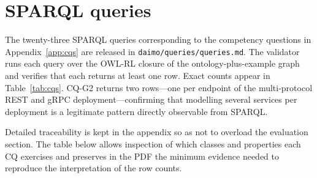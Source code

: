 \documentclass[Afour,sagev,times]{sagej}
\newcommand{\code}[1]{\texttt{#1}}
\begin{document}
\section{SPARQL queries}\label{app:sparql}

The twenty-three SPARQL queries corresponding to the competency questions in Appendix~\ref{app:cqs} are released in \code{daimo/queries/queries.md}. The validator runs each query over the OWL-RL closure of the ontology-plus-example graph and verifies that each returns at least one row. Exact counts appear in Table~\ref{tab:cqs}. CQ-G2 returns two rows---one per endpoint of the multi-protocol REST and gRPC deployment---confirming that modelling several services per deployment is a legitimate pattern directly observable from SPARQL.

Detailed traceability is kept in the appendix so as not to overload the evaluation section. The table below allows inspection of which classes and properties each CQ exercises and preserves in the PDF the minimum evidence needed to reproduce the interpretation of the row counts.
\end{document}
